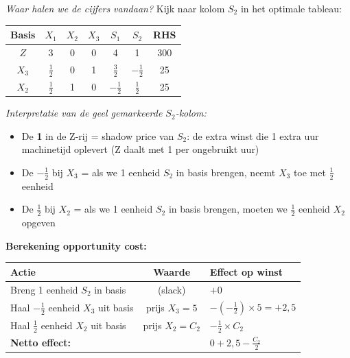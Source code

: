 \documentclass[a4paper,11pt]{article}
\begin{document}
\begin{oefenblok}
    \textit{Waar halen we de cijfers vandaan?} Kijk naar kolom $S_2$ in het optimale tableau:

    \begin{center}
        \begin{tabular}{c|ccccc|c}
            \hline
            Basis & $X_1$         & $X_2$ & $X_3$ & $S_1$          & $S_2$                               & RHS \\
            \hline
            $Z$   & 3             & 0     & 0     & 4              & \cellcolor{yellow!30}1              & 300 \\
            $X_3$ & $\frac{1}{2}$ & 0     & 1     & $\frac{3}{2}$  & \cellcolor{yellow!30}$-\frac{1}{2}$ & 25  \\
            $X_2$ & $\frac{1}{2}$ & 1     & 0     & $-\frac{1}{2}$ & \cellcolor{yellow!30}$\frac{1}{2}$  & 25  \\
            \hline
        \end{tabular}
    \end{center}

    \textit{Interpretatie van de geel gemarkeerde $S_2$-kolom:}
    \begin{itemize}
        \item De \textbf{1} in de Z-rij = shadow price van $S_2$: de extra winst die 1 extra uur machinetijd oplevert (Z daalt met 1 per ongebruikt uur)
        \item De \textbf{$-\frac{1}{2}$} bij $X_3$ = als we 1 eenheid $S_2$ in basis brengen, neemt $X_3$ toe met $\frac{1}{2}$ eenheid
        \item De \textbf{$\frac{1}{2}$} bij $X_2$ = als we 1 eenheid $S_2$ in basis brengen, moeten we $\frac{1}{2}$ eenheid $X_2$ opgeven
    \end{itemize}

    \textbf{Berekening opportunity cost:}

    \begin{center}
        \begin{tabular}{l|c|l}
            \hline
            \textbf{Actie}                              & \textbf{Waarde}           & \textbf{Effect op winst}          \\
            \hline
            Breng 1 eenheid $S_2$ in basis              & (slack)                   & $+0$                              \\
            Haal $-\frac{1}{2}$ eenheid $X_3$ uit basis & prijs $X_3 = 5$           & $-(-\frac{1}{2}) \times 5 = +2{,}5$ \\
            Haal $\frac{1}{2}$ eenheid $X_2$ uit basis  & prijs $X_2 = C_2$         & $-\frac{1}{2} \times C_2$         \\
            \hline
            \multicolumn{2}{l|}{\textbf{Netto effect:}} & $0 + 2{,}5 - \frac{C_2}{2}$                                     \\
            \hline
        \end{tabular}
    \end{center}


\end{oefenblok}
\end{document}
